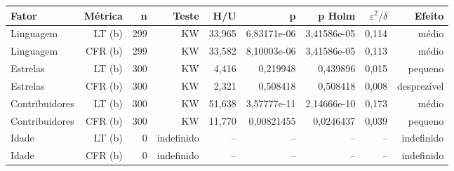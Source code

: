 {\footnotesize
\begin{tabular}{lrrrrrrrr}
\hline
Fator & Métrica & n & Teste & H/U & p & p Holm & $\varepsilon^2/\delta$ & Efeito \\
\hline
Linguagem & LT (b) & 299 & KW & 33,965 & 6,83171e-06 & 3,41586e-05 & 0,114 & médio \\
Linguagem & CFR (b) & 299 & KW & 33,582 & 8,10003e-06 & 3,41586e-05 & 0,113 & médio \\
Estrelas & LT (b) & 300 & KW & 4,416 & 0,219948 & 0,439896 & 0,015 & pequeno \\
Estrelas & CFR (b) & 300 & KW & 2,321 & 0,508418 & 0,508418 & 0,008 & desprezível \\
Contribuidores & LT (b) & 300 & KW & 51,638 & 3,57777e-11 & 2,14666e-10 & 0,173 & médio \\
Contribuidores & CFR (b) & 300 & KW & 11,770 & 0,00821455 & 0,0246437 & 0,039 & pequeno \\
Idade & LT (b) & 0 & indefinido & -- & -- & -- & -- & indefinido \\
Idade & CFR (b) & 0 & indefinido & -- & -- & -- & -- & indefinido \\
\hline
\end{tabular}
}
